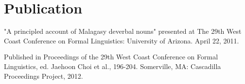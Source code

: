 \section{Publication}
   "A principled account of Malagasy deverbal nouns" presented at
   The 29th West Coast Conference on Formal Linguistics: University of
   Arizona. April 22, 2011.
   \vspace{8pt}
  
   Published in Proceedings of the 29th West Coast Conference on Formal
   Linguistics, ed. Jaehoon Choi et al., 196-204. Somerville, MA:
   Cascadilla Proceedings Project, 2012.
